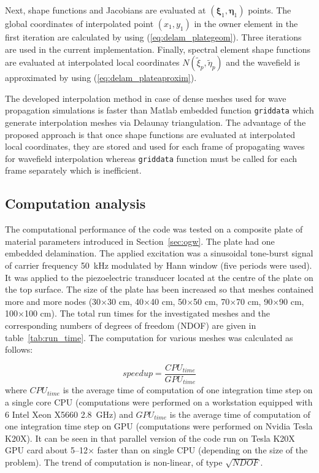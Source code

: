 Next, shape functions and Jacobians are evaluated at \((\boldsymbol{\xi}_{1}, \boldsymbol{\eta}_{1})\) points. The global coordinates of interpolated point \((x_1,y_1)\) in the owner element in the first iteration are calculated by using (\ref{eq:delam_plategeom}). Three iterations are used in the current implementation. Finally, spectral element shape functions are evaluated at interpolated local coordinates \(N(\tilde{\xi}_p,\tilde{\eta}_p)\) and the wavefield is approximated by using (\ref{eq:delam_plateaproxim}).

The developed interpolation method in case of dense meshes used for wave propagation simulations is faster than Matlab embedded function \verb|griddata| which generate interpolation meshes via Delaunay triangulation. The advantage of the proposed approach is that once shape functions are evaluated at interpolated local coordinates, they are stored and used for each frame of propagating waves for wavefield interpolation whereas \verb|griddata| function must be called for each frame separately which is inefficient.

\subsection{Computation   analysis}

The computational performance of the code was tested on a composite plate of material parameters introduced in Section~\ref{sec:ogw}. The plate had one embedded delamination. The applied excitation was a sinusoidal tone-burst signal of carrier frequency 50~kHz modulated by Hann window (five periods were used). It was applied to the piezoelectric transducer located at the centre of the plate on the top surface. The size of the plate has been increased   so that meshes contained more and more nodes (30\(\times\)30 cm, 40\(\times\)40 cm, 50\(\times\)50 cm, 70\(\times\)70 cm, 90\(\times\)90 cm, 100\(\times\)100 cm). The total run times for the investigated meshes and the corresponding numbers of degrees of freedom (NDOF) are given in table~\ref{tab:run_time}. The computation   for various meshes was calculated as follows:

\begin{equation}
speedup = \frac{CPU_{time}}{GPU_{time}}
\label{eq:speedup}
\end{equation}
where \(CPU_{time}\) is the average time of computation of one integration time step on a single core CPU (computations were performed on a workstation equipped with 6   Intel Xeon X5660 2.8~GHz) and \(GPU_{time}\) is the average time of computation of one integration time step on GPU (computations were performed on Nvidia Tesla K20X). It can be seen in   that parallel version of the code run on Tesla K20X GPU card about 5--12\(\times\) faster than on single CPU (depending on the size of the problem). The trend of computation   is non-linear, of type \(\sqrt{NDOF}\). 


